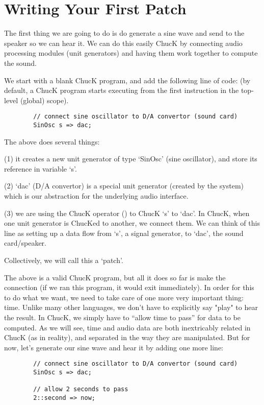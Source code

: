 \section{Writing Your First Patch}

The first thing we are going to do is do generate a sine wave and send to the speaker so we can hear it. We can do this easily ChucK by connecting audio processing modules (unit generators) and having them work together to compute the sound. 

We start with a blank ChucK program, and add the following line of code: (by default, a ChucK program starts executing from the first instruction in the top-level (global) scope).
\begin{verbatim}
        // connect sine oscillator to D/A convertor (sound card)
        SinOsc s => dac;
\end{verbatim}

The above does several things: 

(1) it creates a new unit generator of type `SinOsc' (sine oscillator), and store its reference in variable `s'. 

(2) `dac' (D/A convertor) is a special unit generator (created by the system) which is our abstraction for the underlying audio interface. 

(3) we are using the ChucK operator (\chuckop) to ChucK `s' to `dac'. In ChucK, when one unit generator is ChucKed to another, we connect them. We can think of this line as setting up a data flow from `s', a signal generator, to `dac', the sound card/speaker. 

Collectively, we will call this a `patch'. 

The above is a valid ChucK program, but all it does so far is make the connection (if we ran this program, it would exit immediately). In order for this to do what we want, we need to take care of one more very important thing: time. Unlike many other languages, we don't have to explicitly say "play" to hear the result. In ChucK, we simply have to ``allow time to pass'' for data to be computed. As we will see, time and audio data are both inextricably related in ChucK (as in reality), and separated in the way they are manipulated. But for now, let's generate our sine wave and hear it by adding one more line:

\begin{verbatim}
        // connect sine oscillator to D/A convertor (sound card)
        SinOsc s => dac;

        // allow 2 seconds to pass
        2::second => now;
\end{verbatim}


